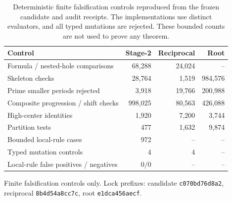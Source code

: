 \begin{table}[t]
\centering
\caption{Deterministic finite falsification controls reproduced from
the frozen candidate and audit receipts.  The implementations use distinct evaluators,
and all typed mutations are rejected.  These bounded counts are not used
to prove any theorem.}
\label{tab:diagnostics}
\small
\begin{tabular}{@{}lrrr@{}}
\toprule
Control & Stage-2 & Reciprocal & Root \\
\midrule
Formula / nested-hole comparisons & 68,288 & 24,024 & -- \\
Skeleton checks & 28,764 & 1,519 & 984,576 \\
Prime smaller periods rejected & 3,918 & 19,766 & 200,988 \\
Composite progression / shift checks & 998,025 & 80,563 & 426,088 \\
High-center identities & 1,920 & 7,200 & 3,744 \\
Partition tests & 477 & 1,632 & 9,874 \\
Bounded local-rule cases & 972 & -- & -- \\
Typed mutation controls & 4 & 4 & -- \\
\midrule
Local-rule false positives / negatives & $0/0$ & -- & -- \\
\bottomrule
\end{tabular}
\par\vspace{2pt}
{\footnotesize Finite falsification controls only.  Lock prefixes:
candidate \texttt{c070bd76d8a2}, reciprocal \texttt{8b4d54a8cc7c}, root \texttt{e1dca456aecf}.}
\end{table}

